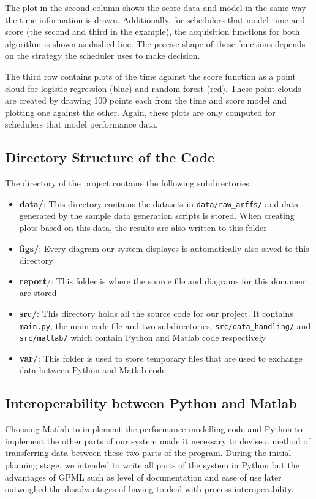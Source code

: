 \documentclass[a4paper,12pt,twoside,openright]{report}
\begin{document}
The plot in the second column shows the score data and model in the same way the time information is drawn. Additionally, for schedulers that model time and score (the second and third in the example), the acquisition functions for both algorithm is shown as dashed line. The precise shape of these functions depends on the strategy the scheduler uses to make decision. 

The third row contains plots of the time against the score function as a point cloud for logistic regression (blue) and random forest (red). These point clouds are created by drawing 100 points each from the time and score model and plotting one against the other. Again, these plots are only computed for schedulers that model performance data.





\subsection{Directory Structure of the Code}

The directory of the project contains the following subdirectories:
\begin{itemize}
\item \textbf{data/}: This directory contains the datasets in \texttt{data/raw\_arffs/} and data generated by the sample data generation scripts is stored. When creating plots based on this data, the results are also written to this folder
\item \textbf{figs/}: Every diagram our system displayes is automatically also saved to this directory
\item \textbf{report}/: This folder is where the source file and diagrams for this document are stored
\item \textbf{src/}: This directory holds all the source code for our project. It contains \texttt{main.py}, the main code file and two subdirectories, \texttt{src/data\_handling/} and \texttt{src/matlab/} which contain Python and Matlab code respectively
\item \textbf{var/}: This folder is used to store temporary files that are used to exchange data between Python and Matlab code
\end{itemize}



\subsection{Interoperability between Python and Matlab}
Choosing Matlab to implement the performance modelling code and Python to implement the other parts of our system made it necessary to devise a method of transferring data between these two parts of the program. During the initial planning stage, we intended to write all parts of the system in Python but the advantages of GPML such as level of documentation and ease of use later outweighed the disadvantages of having to deal with process interoperability.
\end{document}
